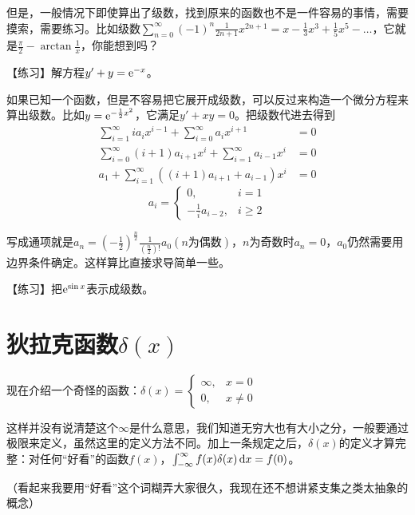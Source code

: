 但是，一般情况下即使算出了级数，找到原来的函数也不是一件容易的事情，需要摸索，需要练习。比如级数$\sum_{n=0}^{\infty} (-1)^n \frac{1}{2n+1} x^{2n+1}=x-\frac{1}{3} x^3+\frac{1}{5} x^5-\dots$，它就是$\frac{\pi}{2}-\arctan \frac{1}{x}$，你能想到吗？

【练习】解方程$y'+y=\mathrm{e}^{-x}$。

如果已知一个函数，但是不容易把它展开成级数，可以反过来构造一个微分方程来算出级数。比如$y=\mathrm{e}^{-\frac{1}{2} x^2}$，它满足$y'+x y=0$。把级数代进去得到
\begin{align*}
\sum_{i=1}^{\infty} i a_i x^{i-1}+\sum_{i=0}^{\infty} a_i x^{i+1}&=0 \\
\sum_{i=0}^{\infty} (i+1) a_{i+1} x^i+\sum_{i=1}^{\infty} a_{i-1} x^i&=0 \\
a_1+\sum_{i=1}^{\infty} ((i+1) a_{i+1}+a_{i-1}) x^i&=0
\end{align*}
\begin{equation*}
a_i=\begin{cases}
0, &i=1 \\
-\frac{1}{i} a_{i-2}, &i \ge 2
\end{cases}
\end{equation*}

写成通项就是$a_n=(-\frac{1}{2})^{\frac{n}{2}} \frac{1}{(\frac{n}{2})!} a_0 (n \text{为偶数})$，$n$为奇数时$a_n=0$，$a_0$仍然需要用边界条件确定。这样算比直接求导简单一些。

【练习】把$\mathrm{e}^{\sin x}$表示成级数。
\section{狄拉克函数$\delta(x)$}
现在介绍一个奇怪的函数：$\delta(x)=\begin{cases} \infty, &x=0 \\ 0, &x \neq 0 \end{cases}$

这样并没有说清楚这个$\infty$是什么意思，我们知道无穷大也有大小之分，一般要通过极限来定义，虽然这里的定义方法不同。加上一条规定之后，$\delta(x)$的定义才算完整：对任何“好看”的函数$f(x)$，$\int_{-\infty}^{\infty} f(x) \delta(x) \mathop{}\!\mathrm{d} x=f(0)$。

（看起来我要用“好看”这个词糊弄大家很久，我现在还不想讲紧支集之类太抽象的概念）

